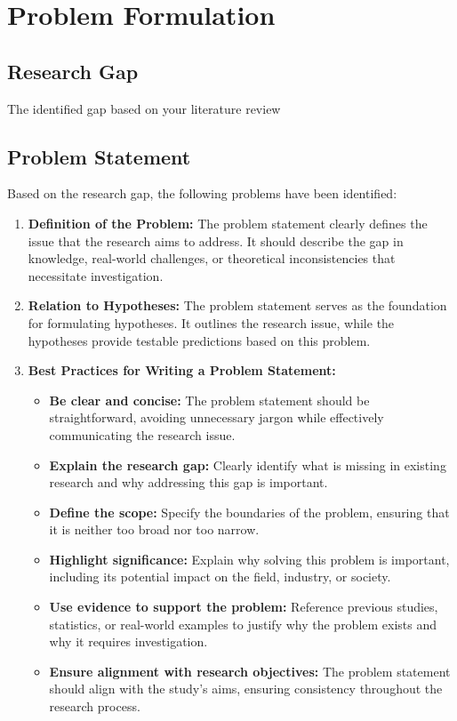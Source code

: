 \section{Problem Formulation}


\subsection{Research Gap}

The identified gap based on your literature review


\subsection{Problem Statement}

Based on the research gap, the following problems have been identified:

\begin{enumerate}
    \item \textbf{Definition of the Problem:} The problem statement clearly defines the issue that the research aims to address. It should describe the gap in knowledge, real-world challenges, or theoretical inconsistencies that necessitate investigation.

    \item \textbf{Relation to Hypotheses:} The problem statement serves as the foundation for formulating hypotheses. It outlines the research issue, while the hypotheses provide testable predictions based on this problem.

    \item \textbf{Best Practices for Writing a Problem Statement:}
    \begin{itemize}
        \item \textbf{Be clear and concise:} The problem statement should be straightforward, avoiding unnecessary jargon while effectively communicating the research issue.
        \item \textbf{Explain the research gap:} Clearly identify what is missing in existing research and why addressing this gap is important.
        \item \textbf{Define the scope:} Specify the boundaries of the problem, ensuring that it is neither too broad nor too narrow.
        \item \textbf{Highlight significance:} Explain why solving this problem is important, including its potential impact on the field, industry, or society.
        \item \textbf{Use evidence to support the problem:} Reference previous studies, statistics, or real-world examples to justify why the problem exists and why it requires investigation.
        \item \textbf{Ensure alignment with research objectives:} The problem statement should align with the study’s aims, ensuring consistency throughout the research process.
    \end{itemize}
\end{enumerate}



